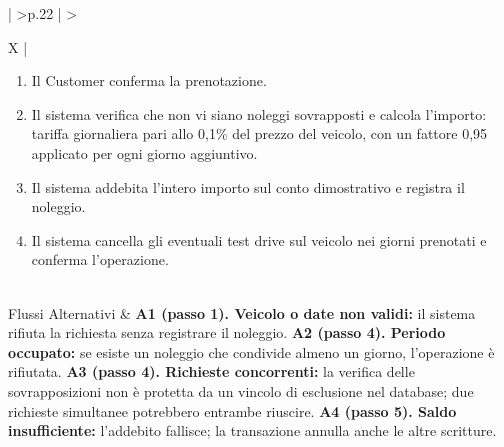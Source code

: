\begin{xltabular}{\textwidth}{| >{\bfseries}p{.22\textwidth} | >{\raggedright\arraybackslash}X |}
\begin{enumerate}[label=\arabic*.,start=1,leftmargin=*,nosep]
  \item Il Customer conferma la prenotazione.
  \item Il sistema verifica che non vi siano noleggi sovrapposti e calcola l'importo: tariffa giornaliera pari allo 0,1\% del prezzo del veicolo, con un fattore 0,95 applicato per ogni giorno aggiuntivo.
  \item Il sistema addebita l'intero importo sul conto dimostrativo e registra il noleggio.
  \item Il sistema cancella gli eventuali test drive sul veicolo nei giorni prenotati e conferma l'operazione.
\end{enumerate}\\\hline
Flussi Alternativi &
\textbf{A1 (passo 1). Veicolo o date non validi:} il sistema rifiuta la richiesta senza registrare il noleggio.\newline\newline
\textbf{A2 (passo 4). Periodo occupato:} se esiste un noleggio che condivide almeno un giorno, l'operazione è rifiutata.\newline\newline
\textbf{A3 (passo 4). Richieste concorrenti:} la verifica delle sovrapposizioni non è protetta da un vincolo di esclusione nel database; due richieste simultanee potrebbero entrambe riuscire.\newline\newline
\textbf{A4 (passo 5). Saldo insufficiente:} l'addebito fallisce; la transazione annulla anche le altre scritture.\\\hline
\end{xltabular}
